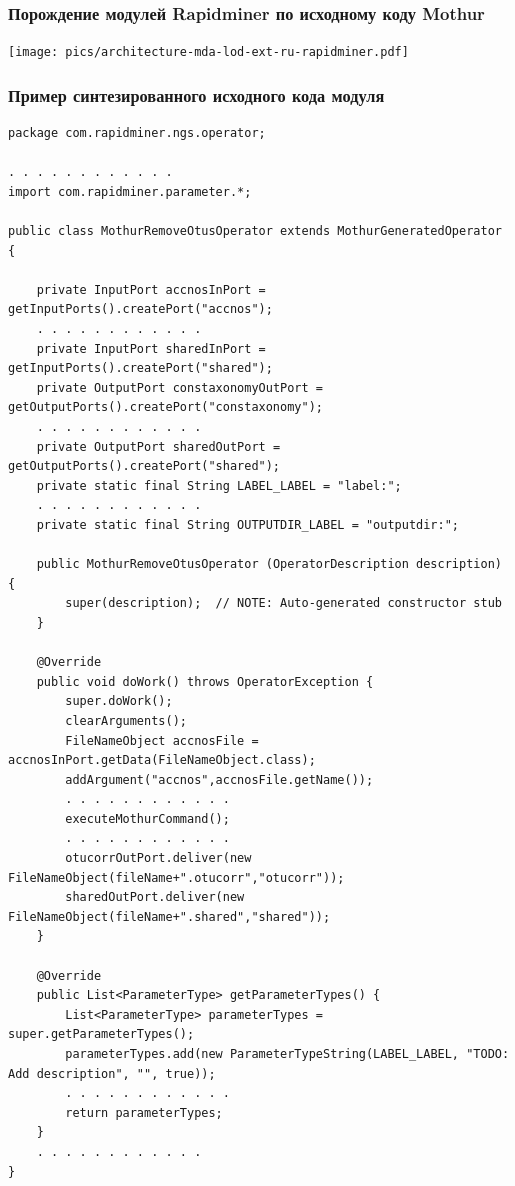 \documentclass[10pt]{beamer}
\begin{document}
\begin{frame}
  \frametitle{Порождение модулей Rapidminer по исходному коду Mothur}
  \begin{center}

  \texttt{[image: pics/architecture-mda-lod-ext-ru-rapidminer.pdf]}

  \end{center}
\end{frame}

\begin{frame}[fragile]
  \frametitle{Пример синтезированного исходного кода модуля}
\begin{verbatim}
package com.rapidminer.ngs.operator;

. . . . . . . . . . . .
import com.rapidminer.parameter.*;

public class MothurRemoveOtusOperator extends MothurGeneratedOperator {

	private InputPort accnosInPort = getInputPorts().createPort("accnos");
	. . . . . . . . . . . .
	private InputPort sharedInPort = getInputPorts().createPort("shared");
	private OutputPort constaxonomyOutPort = getOutputPorts().createPort("constaxonomy");
	. . . . . . . . . . . .
	private OutputPort sharedOutPort = getOutputPorts().createPort("shared");
	private static final String LABEL_LABEL = "label:";
	. . . . . . . . . . . .
	private static final String OUTPUTDIR_LABEL = "outputdir:";

	public MothurRemoveOtusOperator (OperatorDescription description) {
		super(description);  // NOTE: Auto-generated constructor stub
	}

	@Override
	public void doWork() throws OperatorException {
		super.doWork();
		clearArguments();
		FileNameObject accnosFile = accnosInPort.getData(FileNameObject.class);
		addArgument("accnos",accnosFile.getName());
		. . . . . . . . . . . .
		executeMothurCommand();
		. . . . . . . . . . . .
		otucorrOutPort.deliver(new FileNameObject(fileName+".otucorr","otucorr"));
		sharedOutPort.deliver(new FileNameObject(fileName+".shared","shared"));
	}

	@Override
	public List<ParameterType> getParameterTypes() {
		List<ParameterType> parameterTypes = super.getParameterTypes();
		parameterTypes.add(new ParameterTypeString(LABEL_LABEL, "TODO: Add description", "", true));
		. . . . . . . . . . . .
		return parameterTypes;
	}
	. . . . . . . . . . . .
}
\end{verbatim}
\end{frame}
\end{document}
